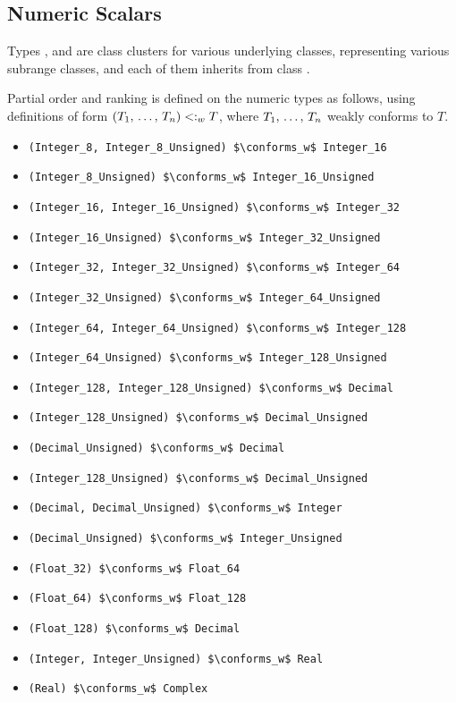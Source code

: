 \subsection{Numeric Scalars}

Types ,  and  are class clusters for various underlying classes, representing various subrange classes, and each of them inherits from class . 

Partial order and ranking is defined on the numeric types as follows, using definitions of form $(T_1 ,\, \ldots ,\, T_n) <:_w T$, where $T_1 ,\, \ldots ,\, T_n$ weakly conforms to $T$. 
\begin{itemize}
\item \lstinline!(Integer_8, Integer_8_Unsigned) $\conforms_w$ Integer_16!
\item \lstinline!(Integer_8_Unsigned) $\conforms_w$ Integer_16_Unsigned!

\item \lstinline!(Integer_16, Integer_16_Unsigned) $\conforms_w$ Integer_32!
\item \lstinline!(Integer_16_Unsigned) $\conforms_w$ Integer_32_Unsigned!

\item \lstinline!(Integer_32, Integer_32_Unsigned) $\conforms_w$ Integer_64!
\item \lstinline!(Integer_32_Unsigned) $\conforms_w$ Integer_64_Unsigned!

\item \lstinline!(Integer_64, Integer_64_Unsigned) $\conforms_w$ Integer_128!
\item \lstinline!(Integer_64_Unsigned) $\conforms_w$ Integer_128_Unsigned!

\item \lstinline!(Integer_128, Integer_128_Unsigned) $\conforms_w$ Decimal!
\item \lstinline!(Integer_128_Unsigned) $\conforms_w$ Decimal_Unsigned!

\item \lstinline!(Decimal_Unsigned) $\conforms_w$ Decimal!
\item \lstinline!(Integer_128_Unsigned) $\conforms_w$ Decimal_Unsigned!

\item \lstinline!(Decimal, Decimal_Unsigned) $\conforms_w$ Integer!
\item \lstinline!(Decimal_Unsigned) $\conforms_w$ Integer_Unsigned!

\item \lstinline!(Float_32) $\conforms_w$ Float_64!
\item \lstinline!(Float_64) $\conforms_w$ Float_128!
\item \lstinline!(Float_128) $\conforms_w$ Decimal!

\item \lstinline!(Integer, Integer_Unsigned) $\conforms_w$ Real!
\item \lstinline!(Real) $\conforms_w$ Complex!
\end{itemize}

